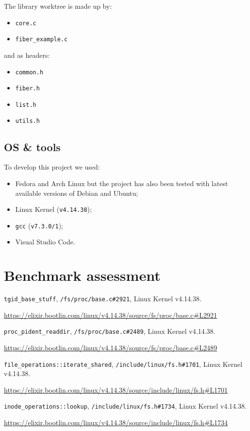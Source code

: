 \documentclass[a4paper,10pt]{article}
\begin{document}
The library worktree is made up by:
\begin{itemize}
	\item \lstinline{core.c}
	\item \lstinline{fiber_example.c}
\end{itemize}
and as headers:
\begin{itemize}
	\item \lstinline{common.h}
	\item \lstinline{fiber.h}
	\item \lstinline{list.h}
	\item \lstinline{utils.h}
\end{itemize}


\subsection{OS \& tools}
To develop this project we used:
\begin{itemize}
	\item Fedora and Arch Linux but the project has also been tested with latest available versions of Debian and Ubuntu;
	\item Linux Kernel (\lstinline{v4.14.38});
	\item \lstinline{gcc} (\lstinline{v7.3.0/1});
	\item Visual Studio Code.
\end{itemize}

\section{Benchmark assessment}

\begin{thebibliography}{9}

	\lstinline{tgid_base_stuff}, \lstinline{/fs/proc/base.c#2921}, Linux Kernel v4.14.38.

	\url{https://elixir.bootlin.com/linux/v4.14.38/source/fs/proc/base.c#L2921}

	\lstinline{proc_pident_readdir}, \lstinline{/fs/proc/base.c#2489}, Linux Kernel v4.14.38.

	\url{https://elixir.bootlin.com/linux/v4.14.38/source/fs/proc/base.c#L2489}

	\lstinline{file_operations::iterate_shared}, \lstinline{/include/linux/fs.h#1701}, Linux Kernel v4.14.38.

	\url{https://elixir.bootlin.com/linux/v4.14.38/source/include/linux/fs.h#L1701}

	\lstinline{inode_operations::lookup}, \lstinline{/include/linux/fs.h#1734}, Linux Kernel v4.14.38.

	\url{https://elixir.bootlin.com/linux/v4.14.38/source/include/linux/fs.h#L1734}

\end{thebibliography}
\end{document}
